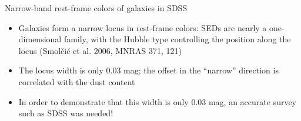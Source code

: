 \documentclass[letterpaper,landscape]{slides}
\begin{document}
\begin{slide}
{\begin{minipage}[t]{9cm}
\begin{center}
\end{center}
\end{minipage}

\begin{minipage}[t]{15cm}
\begin{center}
\vskip -1in
{\large \color{red} Narrow-band rest-frame colors of galaxies in SDSS}
\end{center}

\begin{itemize}
\item
{\color{blue} Galaxies form a narrow locus in rest-frame colors}: SEDs are nearly a
one-dimensional family, with the Hubble type controlling the position
along the locus (Smol\v{c}i\'{c} et al. 2006, MNRAS 371, 121)
\item 
The locus width is only 0.03 mag; the offset in the ``narrow'' direction
is correlated with the dust content
\item
In order to demonstrate that this width is only 0.03 mag, an accurate survey
such as SDSS was needed!
\end{itemize}  
\vskip 0.05in
\end{minipage}}
\vfill 
\end{slide}
\end{document}
